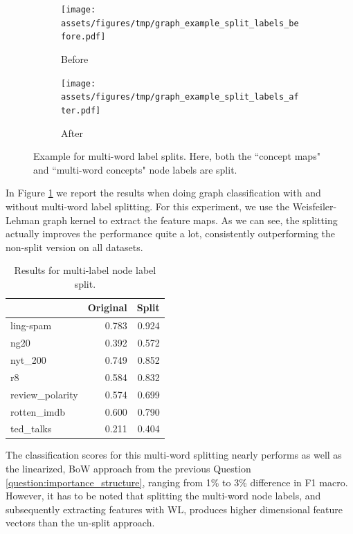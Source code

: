\begin{figure}[htb!]
	\centering
	\begin{subfigure}[t]{.4\linewidth}	{\texttt{[image: assets/figures/tmp/graph\_example\_split\_labels\_before.pdf]}}
		\caption{Before}
	\end{subfigure}
\hspace{2cm}
	\begin{subfigure}[t]{.4\linewidth}	{\texttt{[image: assets/figures/tmp/graph\_example\_split\_labels\_after.pdf]}}
		\caption{After}
	\end{subfigure}
	\caption[Example: Multi-word node labels Splitting]{Example for multi-word label splits. Here, both the ``concept maps" and ``multi-word concepts" node labels are  split.}\label{fig:example_split_labels}
\end{figure}


In Figure \ref{table:results_multi_label_split} we report the results when doing graph classification with and without multi-word label splitting.
For this experiment, we use the Weisfeiler-Lehman graph kernel to extract the feature maps.
As we can see, the splitting actually improves the performance quite a lot, consistently outperforming the non-split version on all datasets.

\begin{table}[htb!]
	\centering
\begin{tabular}{lrr}
	{} &  Original &  Split \\
	\midrule
	ling-spam       & 0.783 & 0.924 \\
	ng20            & 0.392 & 0.572 \\
	nyt\_200         & 0.749 & 0.852 \\
	r8              & 0.584 & 0.832 \\
	review\_polarity & 0.574 & 0.699 \\
	rotten\_imdb     & 0.600 & 0.790 \\
	ted\_talks       & 0.211 & 0.404 \\
	\bottomrule
\end{tabular}
\caption[Results: Multi-label split]{Results for multi-label node label split.}\label{table:results_multi_label_split}
\end{table}

The classification scores for this multi-word splitting nearly performs as well as the linearized, BoW approach from the previous Question \ref{question:importance_structure}, ranging from 1\% to 3\% difference in F1 macro.
However, it has to be noted that splitting the multi-word node labels, and subsequently extracting features with WL, produces higher dimensional feature vectors than the un-split approach.

